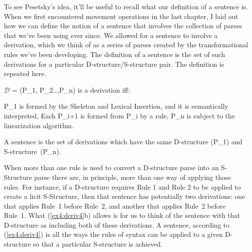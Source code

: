 To see Pesetsky's idea, it'll be useful to recall what our definition of a sentence is. When we first encountered movement operations in the last chapter, I laid out how we can define the notion of a sentence that involves the collection of parses that we've been using ever since. We allowed for a sentence to involve a derivation, which we think of as a series of parses created by the transformational rules we've been developing. The definition of a sentence is the set of such derivations for a particular D-structure/S-structure pair. The definition is repeated here.
\begin{exe}
	\raggedright
	\ex \label{ex4:deriv4}
	$\mathscr{D}$ = (P_1, P_2\ldots,P_n) is a derivation iff:
	\begin{xlist}
		\ex P_1 is formed by the  Skeleton and Lexical Insertion, and it is semantically interpreted,
		\ex Each P_{i+1} is formed from P_{i} by a rule,
		\ex P_n is subject to the linearization algorithm.
	\end{xlist}
	\ex \label{ex4:sendef} A sentence is the set of derivations which have the same D-structure (P_1) and S-structure~(P_n).
\end{exe}
When more than one rule is used to convert a D-structure parse into an S-Structure parse there are, in principle, more than one way of applying those rules. For instance, if a D-structure requires Rule 1 and Rule 2 to be applied to create a licit S-Structure, then that sentence has potentially two derivations: one that applies Rule~1 before Rule~2, and another that applies Rule~2 before Rule~1. What (\ref{ex4:deriv4}b) allows is for us to think of the sentence with that D-structure as including both of these derivations. A sentence, according to (\ref{ex4:deriv4}) is all the ways the rules of syntax can be applied to a given D-structure so that a particular S-structure is achieved.

